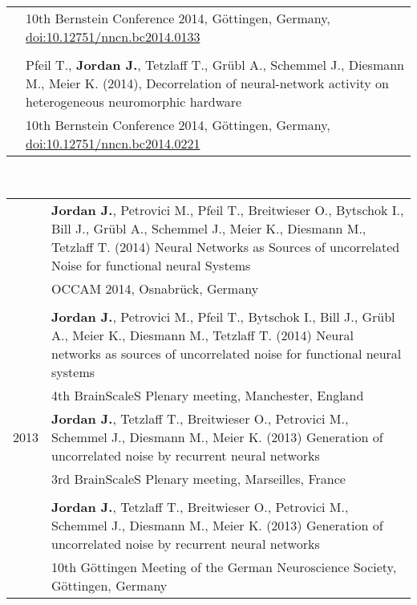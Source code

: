 \begin{tabular}{>{\hfill}p{1.6cm} p{}}
  & \footnotesize 10th Bernstein Conference 2014, G\"ottingen, Germany, \href{http://dx.doi.org/10.12751/nncn.bc2014.0133}{doi:10.12751/nncn.bc2014.0133} \\
  \multicolumn{2}{c}{} \\
  & Pfeil T., \textbf{Jordan J.}, Tetzlaff T., Gr\"ubl A., Schemmel J., Diesmann M., Meier K. (2014), Decorrelation of neural-network activity on heterogeneous neuromorphic hardware \\
  & \footnotesize 10th Bernstein Conference 2014, G\"ottingen, Germany, \href{http://dx.doi.org/10.12751/nncn.bc2014.0221}{doi:10.12751/nncn.bc2014.0221} \\
  \end{tabular} \\[1em]
  \begin{tabular}{>{\hfill}p{1.6cm} p{}}
  & \textbf{Jordan J.}, Petrovici M., Pfeil T., Breitwieser O., Bytschok I., Bill J., Gr\"ubl A., Schemmel J., Meier K., Diesmann M., Tetzlaff T. (2014) Neural Networks as Sources of uncorrelated Noise for functional neural Systems \\
  & \footnotesize OCCAM 2014, Osnabr\"uck, Germany \\
  \multicolumn{2}{c}{} \\
  & \textbf{Jordan J.}, Petrovici M., Pfeil T., Bytschok I., Bill J., Gr\"ubl A., Meier K., Diesmann M., Tetzlaff T. (2014) Neural networks as sources of uncorrelated noise for functional neural systems \\
  & \footnotesize 4th BrainScaleS Plenary meeting, Manchester, England \\
  2013 & \textbf{Jordan J.}, Tetzlaff T., Breitwieser O., Petrovici M., Schemmel J., Diesmann M., Meier K. (2013) Generation of uncorrelated noise by recurrent neural networks \\
  & \footnotesize 3rd BrainScaleS Plenary meeting, Marseilles, France \\
  \multicolumn{2}{c}{} \\
  & \textbf{Jordan J.}, Tetzlaff T., Breitwieser O., Petrovici M., Schemmel J., Diesmann M., Meier K. (2013) Generation of uncorrelated noise by recurrent neural networks \\
  & \footnotesize 10th G\"ottingen Meeting of the German Neuroscience Society, G\"ottingen, Germany \\
  \end{tabular} \\[1em]

